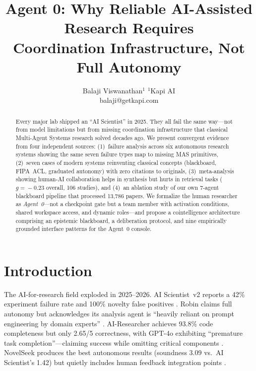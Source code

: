 \documentclass{article}
\title{Agent 0: Why Reliable AI-Assisted Research Requires\\Coordination Infrastructure, Not Full Autonomy}
\author{
Balaji Viswanathan$^1$
\affiliations
$^1$Kapi AI\\
\emails
balaji@getkapi.com
}
\begin{document}
\maketitle

\begin{abstract}
Every major lab shipped an ``AI Scientist'' in 2025.
They all fail the same way---not from model limitations but from missing
coordination infrastructure that classical Multi-Agent Systems research
solved decades ago. We present convergent evidence from four independent
sources: (1)~failure analysis across six autonomous research systems
showing the same seven failure types map to missing MAS primitives,
(2)~seven cases of modern systems reinventing classical concepts
(blackboard, FIPA~ACL, graduated autonomy) with zero citations to
originals, (3)~meta-analysis showing human-AI collaboration helps in
synthesis but hurts in retrieval tasks ($g\!=\!{-}0.23$ overall, 106
studies), and (4)~an ablation study of our own 7-agent blackboard
pipeline that processed 13,786 papers. We formalize the human researcher
as \emph{Agent~0}---not a checkpoint gate but a team member with
activation conditions, shared workspace access, and dynamic roles---and
propose a cointelligence architecture comprising an epistemic blackboard,
a deliberation protocol, and nine empirically grounded interface patterns
for the Agent~0 console.
\end{abstract}

\section{Introduction}
\label{sec:intro}

The AI-for-research field exploded in 2025--2026. AI Scientist~v2
reports a 42\% experiment failure rate and 100\% novelty false positives
\cite{lu2025aiscientist,beel2025evaluating}. Robin claims full autonomy
but acknowledges its analysis agent is ``heavily reliant on prompt
engineering by domain experts'' \cite{ghareeb2025robin}. AI-Researcher
achieves 93.8\% code completeness but only 2.65/5 correctness, with
GPT-4o exhibiting ``premature task completion''---claiming success while
omitting critical components \cite{tang2025airesearcher}. NovelSeek
produces the best autonomous results (soundness 3.09 vs.\ AI
Scientist's 1.42) but quietly includes human feedback integration points
\cite{zhang2025novelseek}.
\end{document}
